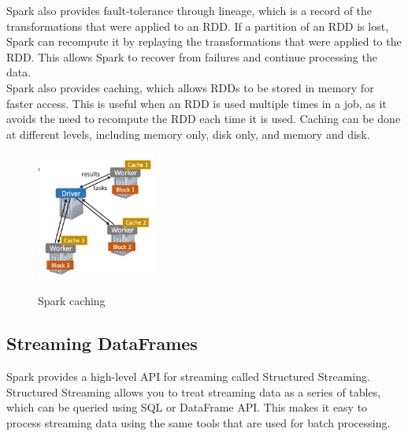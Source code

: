Spark also provides fault-tolerance through lineage, which is a record of the transformations that
were applied to an RDD. If a partition of an RDD is lost, Spark can recompute it by replaying the
transformations that were applied to the RDD. This allows Spark to recover from failures and continue
processing the data.\\

Spark also provides caching, which allows RDDs to be stored in memory for faster access. This is useful
when an RDD is used multiple times in a job, as it avoids the need to recompute the RDD each time it
is used. Caching can be done at different levels, including memory only, disk only, and memory and disk.

\begin{figure}[H]
    \centering
    \includegraphics[width=0.35\textwidth]{figures/spark_caching.png}
    \label{fig:spark_caching}
    \caption{Spark caching}
\end{figure}

\subsection{Streaming DataFrames}

Spark provides a high-level API for streaming called Structured Streaming. Structured Streaming
allows you to treat streaming data as a series of tables, which can be queried using SQL or DataFrame
API. This makes it easy to process streaming data using the same tools that are used for batch processing.\\

